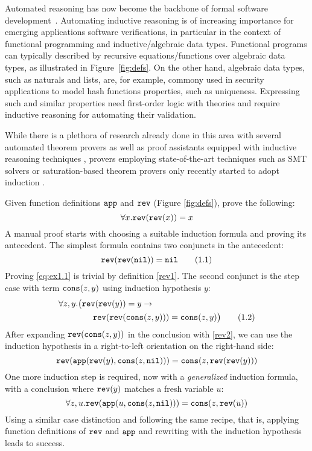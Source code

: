 Automated reasoning has now become the backbone of formal software development~\cite{CAV18Cook}. Automating inductive reasoning is of increasing  importance for emerging applications software verifications, in particular in the context of functional programming and inductive/algebraic data types.
Functional programs can typically described by 
recursive equations/functions over algebraic data types, as illustrated in Figure~\ref{fig:defs}.  On the other hand, algebraic data types, such as naturals and lists, are, for example, commony used in security applications to model hash functions properties, such as uniqueness. Expressing such and similar properties need  first-order logic with theories and require inductive reasoning for automating their validation. 


While there is a plethora of research already done in this area \cite{bundychapter,mooreindutionhistory} with several automated theorem provers as well as proof assistants equipped with inductive reasoning techniques \cite{acl,aclhandbook,inka,oyster}, provers employing state-of-the-art techniques such as SMT solvers or saturation-based theorem provers only recently started to adopt induction \cite{cruanes,vampireinduction,smtinduction}. 

\begin{example}\label{ex:1}
Given function definitions $\mathtt{app}$ and $\mathtt{rev}$ (Figure \ref{fig:defs}), prove the following:
$$\forall x. \mathtt{rev}(\mathtt{rev}(x))=x$$
A manual proof starts with choosing a suitable induction formula and proving its antecedent. The simplest formula contains two conjuncts in the antecedent:
\begin{equation}\label{eq:ex1.1}\mathtt{rev}(\mathtt{rev}(\mathtt{nil})) = \mathtt{nil}\tag{1.1}\end{equation}
Proving \eqref{eq:ex1.1} is trivial by definition \eqref{rev1}. The second conjunct is the step case with term $\mathtt{cons}(z,y)$ using induction hypothesis $y$:
\begin{align}\forall z,y.\big(\mathtt{rev}(\mathtt{rev}(y))&=y\rightarrow\nonumber\\\mathtt{rev}(\mathtt{rev}(&\mathtt{cons}(z,y)))=\mathtt{cons}(z,y)\big)\label{eq:ex1.2}\tag{1.2}\end{align}
After expanding $\mathtt{rev}(\mathtt{cons}(z,y))$ in the conclusion with \eqref{rev2}, we can use the induction hypothesis in a right-to-left orientation on the right-hand side:
$$\mathtt{rev}(\mathtt{app}(\mathtt{rev}(y),\mathtt{cons}(z,\mathtt{nil})))=\mathtt{cons}(z,\mathtt{rev}(\mathtt{rev}(y)))$$
One more induction step is required, now with a \textit{generalized} induction formula, with a conclusion where $\mathtt{rev}(y)$ matches a fresh variable $u$:
$$\forall z,u.\mathtt{rev}(\mathtt{app}(u,\mathtt{cons}(z,\mathtt{nil})))=\mathtt{cons}(z,\mathtt{rev}(u))$$
Using a similar case distinction and following the same recipe, that is, applying function definitions of $\mathtt{rev}$ and $\mathtt{app}$ and rewriting with the induction hypothesis leads to success.
\end{example}

